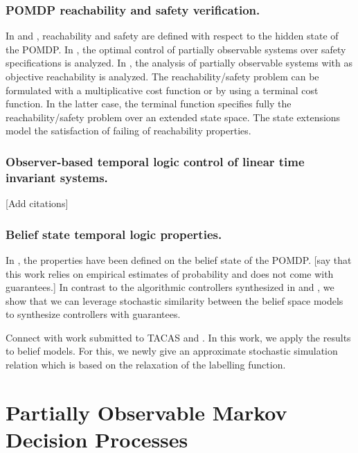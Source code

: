 \documentclass{ifacconf}
\newcommand{\red}[1]{{\color{red} #1}}
\begin{document}
\subsubsection{POMDP reachability and safety verification.}
In  \cite{ding2013optimal} and \cite{LESSER20141989}, reachability and safety  are defined with respect to the hidden state of the POMDP.
%
In \cite{ding2013optimal}, the optimal control of partially observable systems over safety specifications is analyzed. 
In \cite{LESSER20141989}, the analysis of partially observable systems with as objective reachability is analyzed. 
The reachability/safety problem can be formulated with a multiplicative cost function or by using a terminal cost function. In the latter case, the terminal function specifies fully the reachability/safety problem over an extended state space.
The state extensions model the satisfaction of failing of reachability properties.

\subsubsection{Observer-based temporal logic control of  linear time invariant systems.}
\red{[Add citations]}

\subsubsection{Belief state temporal logic properties.} %
In \cite{JonesDTL2013}, the properties have been defined on  the belief state of the POMDP.  \red{[say that this work relies on empirical estimates of probability and does not come with guarantees.]}
In contrast to the algorithmic controllers synthesized in \cite{JonesDTL2013} and \cite{Vasile2016},  we show that we can leverage stochastic similarity between the belief space models to synthesize controllers with guarantees.

\red{Connect with work submitted to TACAS \citep{tech_report_TACAS} and \citep{haesaert2017verification}.  }
In this work, we apply the results to belief models. For this,  we newly give an approximate stochastic simulation relation which is based on the relaxation of the labelling function.
 
\section{Partially Observable Markov Decision Processes}
\end{document}
